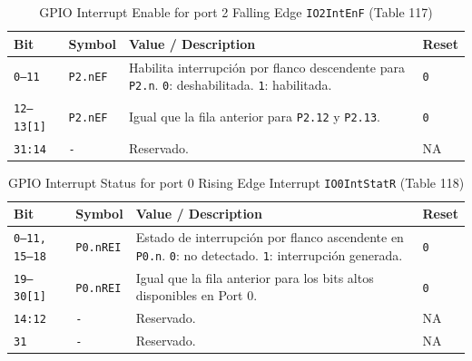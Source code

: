 \begin{table}[H]
  \centering
  \small
  \caption{GPIO Interrupt Enable for port 2 Falling Edge \texttt{IO2IntEnF} (Table 117)}
  \begin{tabularx}{0.96\textwidth}{|>{\centering\arraybackslash}p{}|>{\raggedright\arraybackslash}p{}|>{\raggedright\arraybackslash}X|>{\centering\arraybackslash}p{}|}
    \hline
    \textbf{Bit} & \textbf{Symbol} & \textbf{Value / Description} & \textbf{Reset} \\
    \hline
    \texttt{0--11} & \texttt{P2.nEF} & Habilita interrupción por flanco descendente para \texttt{P2.n}. \texttt{0}: deshabilitada. \texttt{1}: habilitada. & \texttt{0} \\
    \hline
    \texttt{12--13[1]} & \texttt{P2.nEF} & Igual que la fila anterior para \texttt{P2.12} y \texttt{P2.13}. & \texttt{0} \\
    \hline
    \texttt{31:14} & \texttt{-} & Reservado. & NA \\
    \hline
  \end{tabularx}
\end{table}

\begin{table}[H]
  \centering
  \small
  \caption{GPIO Interrupt Status for port 0 Rising Edge Interrupt \texttt{IO0IntStatR} (Table 118)}
  \begin{tabularx}{0.96\textwidth}{|>{\centering\arraybackslash}p{}|>{\raggedright\arraybackslash}p{}|>{\raggedright\arraybackslash}X|>{\centering\arraybackslash}p{}|}
    \hline
    \textbf{Bit} & \textbf{Symbol} & \textbf{Value / Description} & \textbf{Reset} \\
    \hline
    \texttt{0--11, 15--18} & \texttt{P0.nREI} & Estado de interrupción por flanco ascendente en \texttt{P0.n}. \texttt{0}: no detectado. \texttt{1}: interrupción generada. & \texttt{0} \\
    \hline
    \texttt{19--30[1]} & \texttt{P0.nREI} & Igual que la fila anterior para los bits altos disponibles en Port 0. & \texttt{0} \\
    \hline
    \texttt{14:12} & \texttt{-} & Reservado. & NA \\
    \hline
    \texttt{31} & \texttt{-} & Reservado. & NA \\
    \hline
  \end{tabularx}
\end{table}

